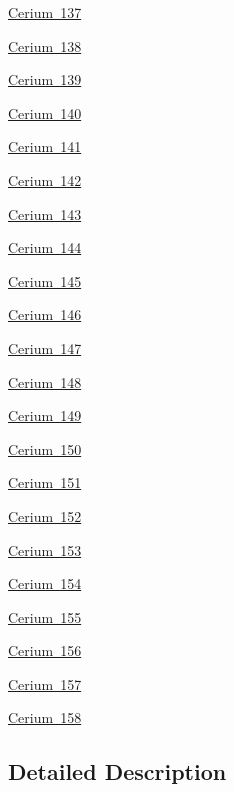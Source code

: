 \begin{DoxyCompactItemize}
\item 
\mbox{\hyperlink{group___isotope_const-_cerium-_ce137}{Cerium 137}}
\item 
\mbox{\hyperlink{group___isotope_const-_cerium-_ce138}{Cerium 138}}
\item 
\mbox{\hyperlink{group___isotope_const-_cerium-_ce139}{Cerium 139}}
\item 
\mbox{\hyperlink{group___isotope_const-_cerium-_ce140}{Cerium 140}}
\item 
\mbox{\hyperlink{group___isotope_const-_cerium-_ce141}{Cerium 141}}
\item 
\mbox{\hyperlink{group___isotope_const-_cerium-_ce142}{Cerium 142}}
\item 
\mbox{\hyperlink{group___isotope_const-_cerium-_ce143}{Cerium 143}}
\item 
\mbox{\hyperlink{group___isotope_const-_cerium-_ce144}{Cerium 144}}
\item 
\mbox{\hyperlink{group___isotope_const-_cerium-_ce145}{Cerium 145}}
\item 
\mbox{\hyperlink{group___isotope_const-_cerium-_ce146}{Cerium 146}}
\item 
\mbox{\hyperlink{group___isotope_const-_cerium-_ce147}{Cerium 147}}
\item 
\mbox{\hyperlink{group___isotope_const-_cerium-_ce148}{Cerium 148}}
\item 
\mbox{\hyperlink{group___isotope_const-_cerium-_ce149}{Cerium 149}}
\item 
\mbox{\hyperlink{group___isotope_const-_cerium-_ce150}{Cerium 150}}
\item 
\mbox{\hyperlink{group___isotope_const-_cerium-_ce151}{Cerium 151}}
\item 
\mbox{\hyperlink{group___isotope_const-_cerium-_ce152}{Cerium 152}}
\item 
\mbox{\hyperlink{group___isotope_const-_cerium-_ce153}{Cerium 153}}
\item 
\mbox{\hyperlink{group___isotope_const-_cerium-_ce154}{Cerium 154}}
\item 
\mbox{\hyperlink{group___isotope_const-_cerium-_ce155}{Cerium 155}}
\item 
\mbox{\hyperlink{group___isotope_const-_cerium-_ce156}{Cerium 156}}
\item 
\mbox{\hyperlink{group___isotope_const-_cerium-_ce157}{Cerium 157}}
\item 
\mbox{\hyperlink{group___isotope_const-_cerium-_ce158}{Cerium 158}}
\end{DoxyCompactItemize}


\subsection{Detailed Description}

